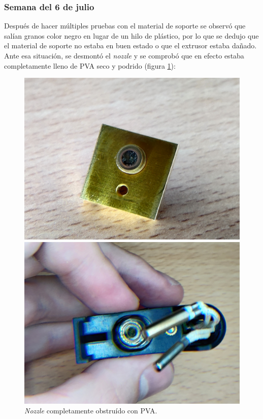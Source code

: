 \subsubsection*{Semana del 6 de julio}
Después de hacer múltiples pruebas con el material de soporte se observó que salían granos
color negro en lugar de un hilo de plástico, por lo que se dedujo que el material de
soporte no estaba en buen estado o que el extrusor estaba dañado. Ante esa situación,
se desmontó el \textit{nozzle} y se comprobó que en efecto estaba completamente lleno
de \ac{PVA} seco y podrido (figura \ref{fig:nozzle_oof}):

\begin{figure}[H]
    \centering
    \begin{minipage}{.49\linewidth}
        \includegraphics[width=\linewidth]{pictures/clogged_nozzle.jpg}
    \end{minipage}
    \hfill
    \begin{minipage}{.49\linewidth}
        \includegraphics[width=\linewidth]{pictures/nozzle_oof_2.jpg}
    \end{minipage}
    \caption{\textit{Nozzle} completamente obstruído con \ac{PVA}.}        
    \label{fig:nozzle_oof}
\end{figure}

